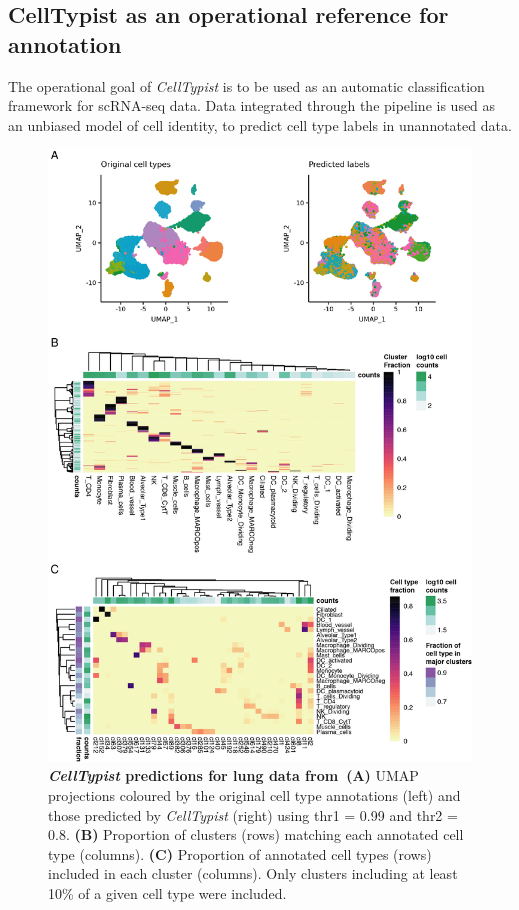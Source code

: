 \subsection{CellTypist as an operational reference for annotation}
\label{section_test}
The operational goal of \textit{CellTypist} is to be used as an automatic classification framework for scRNA-seq data. Data integrated through the pipeline is used as an unbiased model of cell identity, to predict cell type labels in unannotated data.

\begin{figure}[pht!] 
\centering
\includegraphics[scale=0.83]{Chapter4/Figs/chap4_preds.png} %
\caption[\textit{CellTypist} predictions for lung data from~\citep{madissoon_lung_2019}]{\textbf{\textit{CellTypist} predictions for lung data from~\citep{madissoon_lung_2019}}\newline\textbf{(A)} UMAP projections coloured by the original cell type annotations (left) and those predicted by \textit{CellTypist} (right) using thr1 = 0.99 and thr2 = 0.8. \textbf{(B)} Proportion of clusters (rows) matching each annotated cell type (columns). \textbf{(C)} Proportion of annotated cell types (rows) included in each cluster (columns). Only clusters including at least 10\% of a given cell type were included.}
\label{fig:chap4_preds}
\end{figure}


